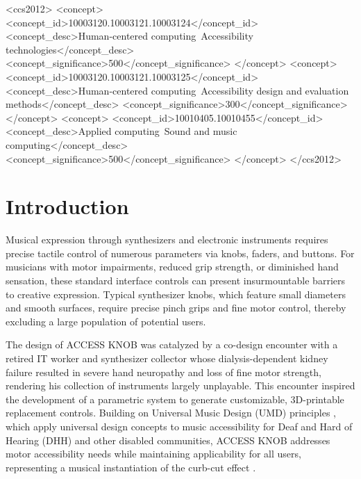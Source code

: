 \documentclass[manuscript,screen,review,anonymous]{acmart}
\begin{document}
\begin{CCSXML}
<ccs2012>
<concept>
<concept_id>10003120.10003121.10003124</concept_id>
<concept_desc>Human-centered computing~Accessibility technologies</concept_desc>
<concept_significance>500</concept_significance>
</concept>
<concept>
<concept_id>10003120.10003121.10003125</concept_id>
<concept_desc>Human-centered computing~Accessibility design and evaluation methods</concept_desc>
<concept_significance>300</concept_significance>
</concept>
<concept>
<concept_id>10010405.10010455</concept_id>
<concept_desc>Applied computing~Sound and music computing</concept_desc>
<concept_significance>500</concept_significance>
</concept>
</ccs2012>
\end{CCSXML}



\maketitle

\section{Introduction}

Musical expression through synthesizers and electronic instruments requires precise tactile control of numerous parameters via knobs, faders, and buttons. For musicians with motor impairments, reduced grip strength, or diminished hand sensation, these standard interface controls can present insurmountable barriers to creative expression. Typical synthesizer knobs, which feature small diameters and smooth surfaces, require precise pinch grips and fine motor control, thereby excluding a large population of potential users.

The design of ACCESS KNOB was catalyzed by a co-design encounter with a retired IT worker and synthesizer collector whose dialysis-dependent kidney failure resulted in severe hand neuropathy and loss of fine motor strength, rendering his collection of instruments largely unplayable. This encounter inspired the development of a parametric system to generate customizable, 3D-printable replacement controls. Building on Universal Music Design (UMD) principles \cite{hergert2024gestolumina, cavdir2024sonic}, which apply universal design concepts to music accessibility for Deaf and Hard of Hearing (DHH) and other disabled communities, ACCESS KNOB addresses motor accessibility needs while maintaining applicability for all users, representing a musical instantiation of the curb-cut effect \cite{treviranus2014}.
\end{document}
